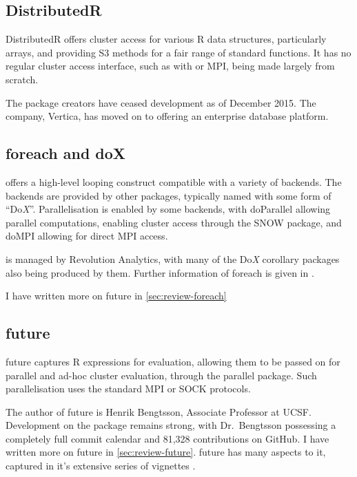 \hypertarget{sec:distributedr}{%
    \subsection{DistributedR}\label{sec:distributedr}}

DistributedR offers cluster access for various R data structures,
particularly arrays, and providing S3 methods for a fair range of
standard functions. It has no regular cluster access interface, such as
with  or MPI, being made largely from scratch.

The package creators have ceased development as of December 2015. The
company, Vertica, has moved on to offering an enterprise database
platform\cite{vertica:_distr}.

\hypertarget{sec:foreach-doc}{%
    \subsection{foreach and doX}\label{sec:foreach-doc}}

 offers a high-level looping construct compatible with a variety
of backends\cite{microsoft20}. The backends are provided by other
packages, typically named with some form of ``Do\emph{X}''.
Parallelisation is enabled by some backends, with doParallel allowing
parallel computations\cite{corporation19},  enabling cluster
access through the SNOW package\cite{dosnow19}, and doMPI allowing for
direct MPI access\cite{weston17}.

 is managed by Revolution Analytics, with many of the Do\emph{X}
corollary packages also being produced by them. Further information of
foreach is given in \cite{weston19:_using}.

I have written more on future in \cref{sec:review-foreach}

\hypertarget{sec:future-furrr}{%
    \subsection{future}\label{sec:future-furrr}}

future captures R expressions for evaluation, allowing them to be passed
on for parallel and ad-hoc cluster evaluation, through the parallel
package\cite{bengtsson20}. Such parallelisation uses the standard MPI or
SOCK protocols.

The author of future is Henrik Bengtsson, Associate Professor at UCSF.
Development on the package remains strong, with Dr.~Bengtsson possessing
a completely full commit calendar and 81,328 contributions on GitHub. I
have written more on future in \cref{sec:review-future}. future has many aspects to it, captured in it's
extensive series of vignettes\cite{bengtsson20:_futur_r}\cite{bengtsson20:_futur_r2}
\cite{bengtsson20:_futur_r3}\cite{bengtsson20:_futur_r4}\cite{bengtsson20:_futur_r5}\cite{bengtsson20:_futur_r6}.

